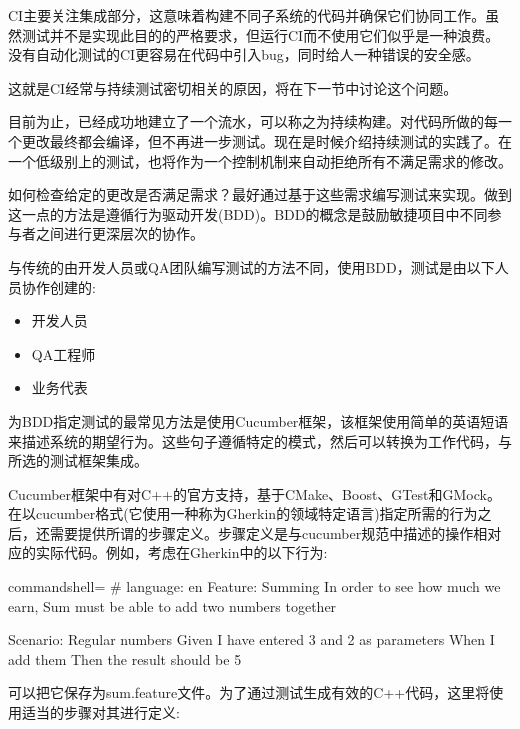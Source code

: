 
CI主要关注集成部分，这意味着构建不同子系统的代码并确保它们协同工作。虽然测试并不是实现此目的的严格要求，但运行CI而不使用它们似乎是一种浪费。没有自动化测试的CI更容易在代码中引入bug，同时给人一种错误的安全感。

这就是CI经常与持续测试密切相关的原因，将在下一节中讨论这个问题。


目前为止，已经成功地建立了一个流水，可以称之为持续构建。对代码所做的每一个更改最终都会编译，但不再进一步测试。现在是时候介绍持续测试的实践了。在一个低级别上的测试，也将作为一个控制机制来自动拒绝所有不满足需求的修改。

如何检查给定的更改是否满足需求？最好通过基于这些需求编写测试来实现。做到这一点的方法是遵循行为驱动开发(BDD)。BDD的概念是鼓励敏捷项目中不同参与者之间进行更深层次的协作。

与传统的由开发人员或QA团队编写测试的方法不同，使用BDD，测试是由以下人员协作创建的:

\begin{itemize}
\item 
开发人员

\item 
QA工程师

\item 
业务代表
\end{itemize}

为BDD指定测试的最常见方法是使用Cucumber框架，该框架使用简单的英语短语来描述系统的期望行为。这些句子遵循特定的模式，然后可以转换为工作代码，与所选的测试框架集成。

Cucumber框架中有对C++的官方支持，基于CMake、Boost、GTest和GMock。在以cucumber格式(它使用一种称为Gherkin的领域特定语言)指定所需的行为之后，还需要提供所谓的步骤定义。步骤定义是与cucumber规范中描述的操作相对应的实际代码。例如，考虑在Gherkin中的以下行为:

\begin{tcblisting}{commandshell={}}
# language: en
Feature: Summing
In order to see how much we earn,
Sum must be able to add two numbers together

Scenario: Regular numbers
  Given I have entered 3 and 2 as parameters
  When I add them
  Then the result should be 5
\end{tcblisting}

可以把它保存为sum.feature文件。为了通过测试生成有效的C++代码，这里将使用适当的步骤对其进行定义:

